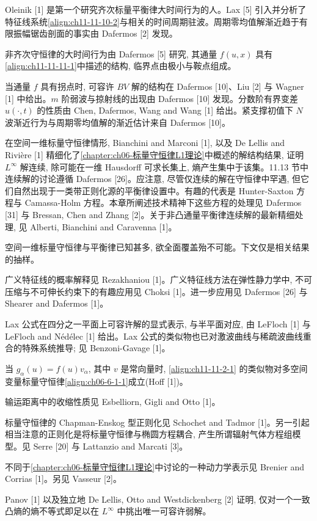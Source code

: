 \documentclass[../../main.tex]{subfiles}
\begin{document}
Oleinik [1] 是第一个研究齐次标量平衡律大时间行为的人。Lax [5] 引入并分析了特征线系统\eqref{align:ch11-11-10-2}与相关的时间周期驻波。周期零均值解渐近趋于有限振幅锯齿剖面的事实由 Dafermos [2] 发现。

非齐次守恒律的大时间行为由 Dafermos [5] 研究, 其通量 $f(u,x)$ 具有\eqref{align:ch11-11-11-1}中描述的结构, 临界点由极小与鞍点组成。

当通量 $f$ 具有拐点时, 可容许 $BV$ 解的结构在 Dafermos [10]、Liu [2] 与 Wagner [1] 中给出。$m$ 阶弱波与掠射线的出现由 Dafermos [10] 发现。分数阶有界变差 $u(\cdot,t)$ 的性质由 Chen, Dafermos, Wang and Wang [1] 给出。紧支撑初值下 $N$ 波渐近行为与周期零均值解的渐近估计来自 Dafermos [10]。

在空间一维标量守恒律情形, Bianchini and Marconi [1], 以及 De Lellis and Rivière [1] 精细化了\cref{chapter:ch06-标量守恒律L1理论}中概述的解结构结果, 证明 $L^\infty$ 解连续, 除可能在一维 Hausdorff 可求长集上, 熵产生集中于该集。11.13 节中连续解的讨论遵循 Dafermos [26]。应注意, 尽管仅连续的解在守恒律中罕遇, 但它们自然出现于一类带正则化源的平衡律设置中。有趣的代表是 Hunter-Saxton 方程与 Camassa-Holm 方程。本章所阐述技术精神下这些方程的处理见 Dafermos [31] 与 Bressan, Chen and Zhang [2]。关于非凸通量平衡律连续解的最新精细处理, 见 Alberti, Bianchini and Caravenna [1]。


空间一维标量守恒律与平衡律已知甚多, 欲全面覆盖殆不可能。下文仅是相关结果的抽样。

广义特征线的概率解释见 Rezakhaniou [1]。广义特征线方法在弹性静力学中, 不可压缩与不可伸长约束下的有趣应用见 Choksi [1]。进一步应用见 Dafermos [26] 与 Shearer and Dafermos [1]。

Lax 公式在四分之一平面上可容许解的显式表示, 与半平面对应, 由 LeFloch [1] 与 LeFloch and Nédélec [1] 给出。Lax 公式的类似物也已对激波曲线与稀疏波曲线重合的特殊系统推导; 见 Benzoni-Gavage [1]。

当 $g_\alpha(u)=f(u)v_\alpha$, 其中 $v$ 是常向量时, \eqref{align:ch11-11-2-1} 的类似物对多空间变量标量守恒律\eqref{align:ch06-6-1-1}成立(Hoff [1])。

输运距离中的收缩性质见 Esbelliorn, Gigli and Otto [1]。

标量守恒律的 Chapman-Enskog 型正则化见 Schochet and Tadmor [1]。另一引起相当注意的正则化是将标量守恒律与椭圆方程耦合, 产生所谓辐射气体方程组模型。见 Serre [20] 与 Lattanzio and Marcati [3]。

不同于\cref{chapter:ch06-标量守恒律L1理论}中讨论的一种动力学表示见 Brenier and Corrias [1]。另见 Vasseur [2]。


Panov [1] 以及独立地 De Lellis, Otto and Westdickenberg [2] 证明, 仅对一个一致凸熵的熵不等式即足以在 $L^\infty$ 中挑出唯一可容许弱解。
\end{document}
